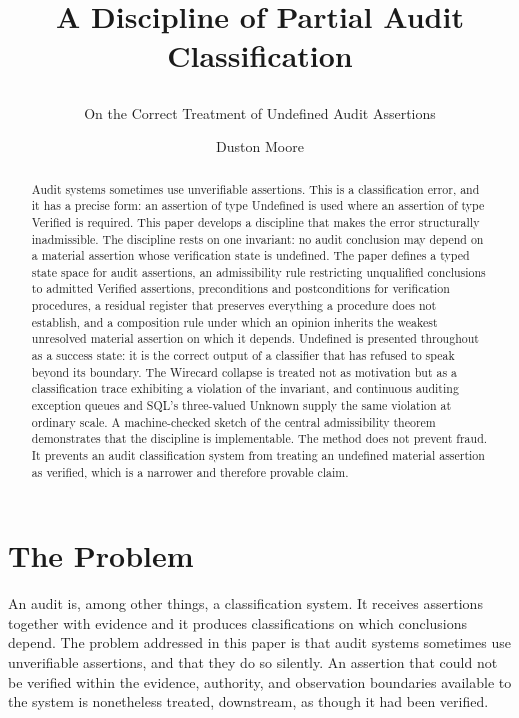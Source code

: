 \documentclass[smallcondensed,envcountsect,natbib]{svjour3}
\title{A Discipline of Partial Audit Classification \subtitle{On the Correct Treatment of Undefined Audit Assertions}}
\author{Duston Moore}
\institute{D.~Moore \at
Independent Researcher, Edmonton, Alberta, Canada \\
\email{dhwcmoore@gmail.com}}
\newcommand{\state}[1]{\textsf{#1}}
\begin{document}
\maketitle

\begin{abstract}
Audit systems sometimes use unverifiable assertions. This is a classification error, and it has a precise form: an assertion of type \state{Undefined} is used where an assertion of type \state{Verified} is required. This paper develops a discipline that makes the error structurally inadmissible. The discipline rests on one invariant: no audit conclusion may depend on a material assertion whose verification state is undefined. The paper defines a typed state space for audit assertions, an admissibility rule restricting unqualified conclusions to admitted \state{Verified} assertions, preconditions and postconditions for verification procedures, a residual register that preserves everything a procedure does not establish, and a composition rule under which an opinion inherits the weakest unresolved material assertion on which it depends. \state{Undefined} is presented throughout as a success state: it is the correct output of a classifier that has refused to speak beyond its boundary. The Wirecard collapse is treated not as motivation but as a classification trace exhibiting a violation of the invariant, and continuous auditing exception queues and SQL's three-valued \state{Unknown} supply the same violation at ordinary scale. A machine-checked sketch of the central admissibility theorem demonstrates that the discipline is implementable. The method does not prevent fraud. It prevents an audit classification system from treating an undefined material assertion as verified, which is a narrower and therefore provable claim.
\end{abstract}

\section{The Problem}
\label{sec:problem}

An audit is, among other things, a classification system. It receives assertions together with evidence and it produces classifications on which conclusions depend. The problem addressed in this paper is that audit systems sometimes use unverifiable assertions, and that they do so silently. An assertion that could not be verified within the evidence, authority, and observation boundaries available to the system is nonetheless treated, downstream, as though it had been verified.
\end{document}
